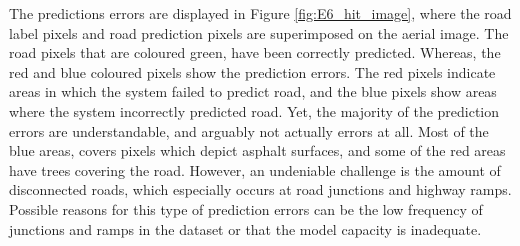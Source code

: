 The predictions errors are displayed in Figure \ref{fig:E6_hit_image}, where the road label pixels and road prediction pixels are superimposed on the aerial image. The road pixels that are coloured green, have been correctly predicted. Whereas, the red and blue coloured pixels show the prediction errors. The red pixels indicate areas in which the system failed to predict road, and the blue pixels show areas where the system incorrectly predicted road. Yet, the majority of the prediction errors are understandable, and arguably not actually errors at all. Most of the blue areas, covers pixels which depict asphalt surfaces, and some of the red areas have trees covering the road. However, an undeniable challenge is the amount of disconnected roads, which especially occurs at road junctions and highway ramps. Possible reasons for this type of prediction errors can be the low frequency of junctions and ramps in the dataset or that the model capacity is inadequate. \\



